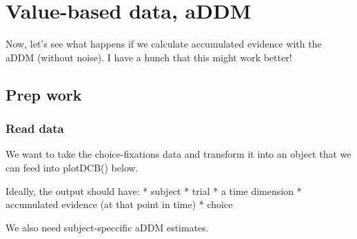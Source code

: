 \documentclass[
]{book}
\begin{document}
\hypertarget{value-based-data-addm}{%
\section{Value-based data, aDDM}\label{value-based-data-addm}}

Now, let's see what happens if we calculate accumulated evidence with the aDDM (without noise). I have a hunch that this might work better!

\hypertarget{prep-work-3}{%
\subsection{Prep work}\label{prep-work-3}}

\hypertarget{read-data-1}{%
\subsubsection*{Read data}\label{read-data-1}}

We want to take the choice-fixations data and transform it into an object that we can feed into plotDCB() below.

Ideally, the output should have:
* subject
* trial
* a time dimension
* accumulated evidence (at that point in time)
* choice

We also need subject-speccific aDDM estimates.
\end{document}
